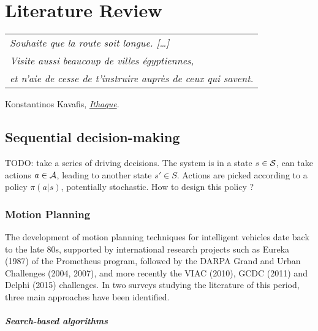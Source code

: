 
\chapter{Literature Review}
\label{chapter:2}

\begin{flushright}
	\begin{tabular}{@{}l@{}}
		\emph{Souhaite que la route soit longue. [\dots]}\\
		\emph{Visite aussi beaucoup de villes égyptiennes,}\\
		\emph{et n’aie de cesse de t’instruire auprès de ceux qui savent.}\\
	\end{tabular}
	
	Konstantinos Kavafis, \href{https://eleurent.github.io/sisyphe/texts/ithaki.html}{\emph{Ithaque}}.
\end{flushright}

\section{Sequential decision-making}

TODO: take a series of driving decisions. The system is in a state $s\in\mathcal{S}$, can take actions $a\in\mathcal{A}$, leading to another state $s'\in S$. Actions are picked according to a policy $\pi(a|s)$, potentially stochastic. How to design this policy ?

\subsection{Motion Planning}

The development of motion planning techniques for intelligent vehicles date back to the late 80s, supported by international research projects such as Eureka (1987) of the Prometheus program, followed by the DARPA Grand and Urban Challenges (2004, 2007), and more recently the VIAC (2010), GCDC (2011) and Delphi (2015) challenges. In two surveys \citep{Gonzalez2016,Paden2016} studying the literature of this period, three main approaches have been identified.

\paragraph{Search-based algorithms}

